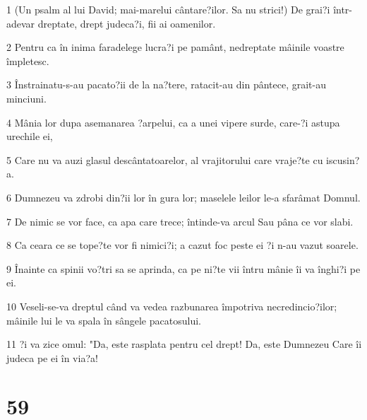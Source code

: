 \par 1 (Un psalm al lui David; mai-marelui cântare?ilor. Sa nu strici!) De grai?i într-adevar dreptate, drept judeca?i, fii ai oamenilor.
\par 2 Pentru ca în inima faradelege lucra?i pe pamânt, nedreptate mâinile voastre împletesc.
\par 3 Înstrainatu-s-au pacato?ii de la na?tere, ratacit-au din pântece, grait-au minciuni.
\par 4 Mânia lor dupa asemanarea ?arpelui, ca a unei vipere surde, care-?i astupa urechile ei,
\par 5 Care nu va auzi glasul descântatoarelor, al vrajitorului care vraje?te cu iscusin?a.
\par 6 Dumnezeu va zdrobi din?ii lor în gura lor; maselele leilor le-a sfarâmat Domnul.
\par 7 De nimic se vor face, ca apa care trece; întinde-va arcul Sau pâna ce vor slabi.
\par 8 Ca ceara ce se tope?te vor fi nimici?i; a cazut foc peste ei ?i n-au vazut soarele.
\par 9 Înainte ca spinii vo?tri sa se aprinda, ca pe ni?te vii întru mânie îi va înghi?i pe ei.
\par 10 Veseli-se-va dreptul când va vedea razbunarea împotriva necredincio?ilor; mâinile lui le va spala în sângele pacatosului.
\par 11 ?i va zice omul: "Da, este rasplata pentru cel drept! Da, este Dumnezeu Care îi judeca pe ei în via?a!

\chapter{59}

